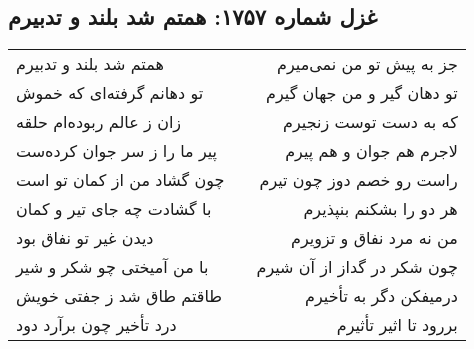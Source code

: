 \begin{center}
\section*{غزل شماره ۱۷۵۷: همتم شد بلند و تدبیرم}
\label{sec:1757}
\begin{longtable}{l p{0.5cm} r}
همتم شد بلند و تدبیرم
&&
جز به پیش تو من نمی‌میرم
\\
تو دهانم گرفته‌ای که خموش
&&
تو دهان گیر و من جهان گیرم
\\
زان ز عالم ربوده‌ام حلقه
&&
که به دست توست زنجیرم
\\
پیر ما را ز سر جوان کرده‌ست
&&
لاجرم هم جوان و هم پیرم
\\
چون گشاد من از کمان تو است
&&
راست رو خصم دوز چون تیرم
\\
با گشادت چه جای تیر و کمان
&&
هر دو را بشکنم بنپذیرم
\\
دیدن غیر تو نفاق بود
&&
من نه مرد نفاق و تزویرم
\\
با من آمیختی چو شکر و شیر
&&
چون شکر در گداز از آن شیرم
\\
طاقتم طاق شد ز جفتی خویش
&&
درمیفکن دگر به تأخیرم
\\
درد تأخیر چون برآرد دود
&&
بررود تا اثیر تأثیرم
\\
\end{longtable}
\end{center}
